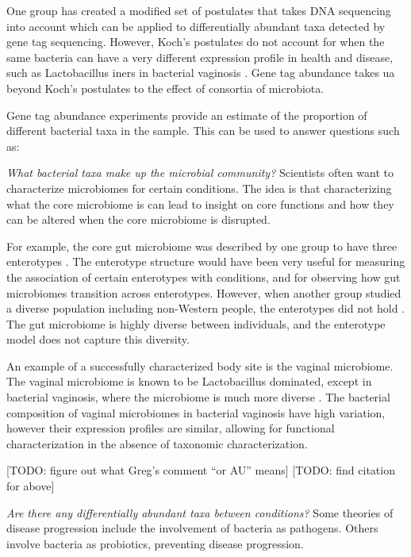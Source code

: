 One group has created a modified set of postulates that takes DNA sequencing into account \cite{fredericks1996sequence} which can be applied to differentially abundant taxa detected by gene tag sequencing. However, Koch’s postulates do not account for when the same bacteria can have a very different expression profile in health and disease, such as Lactobacillus iners in bacterial vaginosis \cite{macklaim2013comparative}. Gene tag abundance takes ua beyond Koch's postulates to the effect of consortia of microbiota.

Gene tag abundance experiments provide an estimate of the proportion of different bacterial taxa in the sample. This can be used to answer questions such as:

\textit{What bacterial taxa make up the microbial community?}
Scientists often want to characterize microbiomes for certain conditions. The idea is that characterizing what the core microbiome is can lead to insight on core functions and how they can be altered when the core microbiome is disrupted.

For example, the core gut microbiome was described by one group to have three enterotypes \cite{arumugam2011enterotypes}. The enterotype structure would have been very useful for measuring the association of certain enterotypes with conditions, and for observing how gut microbiomes transition across enterotypes. However, when another group studied a diverse population including non-Western people, the enterotypes did not hold \cite{yatsunenko2012human}. The gut microbiome is highly diverse between individuals, and the enterotype model does not capture this diversity.

An example of a successfully characterized body site is the vaginal microbiome. The vaginal microbiome is known to be Lactobacillus dominated, except in bacterial vaginosis, where the microbiome is much more diverse \cite{hummelen2010deep}. The bacterial composition of vaginal microbiomes in bacterial vaginosis have high variation, however their expression profiles are similar, allowing for functional characterization in the absence of taxonomic characterization.

[TODO: figure out what Greg's comment ``or AU'' means]
[TODO: find citation for above]

\textit{Are there any differentially abundant taxa between conditions?}
Some theories of disease progression include the involvement of bacteria as pathogens. Others involve bacteria as probiotics, preventing disease progression.


